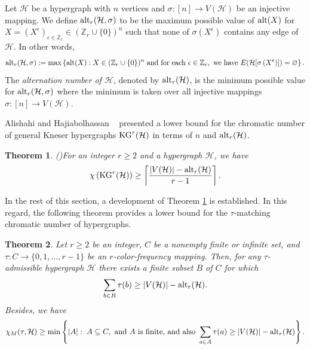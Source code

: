 \documentclass[11pt]{amsart}
\newtheorem{theorem}{Theorem} %
\theoremstyle{definition}
\begin{document}
Let ${\mathcal H}$ be a hypergraph with $n$ vertices and $\sigma:[n]\longrightarrow V({\mathcal H})$ be an injective mapping.
We define ${\rm alt}_r({\mathcal H},\sigma)$ to be the maximum possible value of
${\rm alt} (X)$ for  $X=\displaystyle{\left(X^\epsilon\right)}_{\epsilon\in\mathbb{Z}_r}\in (\mathbb{Z}_r\cup\{0\})^n$ such that none of $\sigma(X^\epsilon)$ contains any edge of ${\mathcal H}$.
In other words,
$${\rm alt}_r({\mathcal H},\sigma) :=\max\left\{{\rm alt}(X): X\in(\mathbb{Z}_r\cup\{0\})^n \mbox{ and for each } \epsilon\in \mathbb{Z}_r, \mbox{ we have } E({\mathcal H}[\sigma\left(X^\epsilon\right)])=\varnothing  \right\}.$$
The {\it alternation number of ${\mathcal H}$}, denoted by ${\rm alt}_r({\mathcal H})$, is the minimum possible value for ${\rm alt}_r({\mathcal H},\sigma)$ where the minimum is taken over all
injective mappings $\sigma:[n]\longrightarrow V({\mathcal H})$.

Alishahi and Hajiabolhassan ~\cite{2013arXiv1302.5394A} presented a lower bound for the chromatic number of general Kneser hypergraphs ${\rm KG}^r({\mathcal H})$ in terms of $n$ and ${\rm alt}_r({\mathcal H})$.
\begin{theorem}{\rm (\cite{2013arXiv1302.5394A})}\label{alihaji}
	For an integer $r\geq 2$ and a hypergraph ${\mathcal H}$, we have
	$$\chi\left({\rm KG}^r({\mathcal H})\right)\geq \left\lceil{ |V({\mathcal H})|-{\rm alt}_r({\mathcal H})\over r-1}\right\rceil.$$
\end{theorem}

In the rest of this section, a development of Theorem \ref{alihaji} is established. In this regard, the following theorem provides a lower bound for the $\tau$-matching chromatic number of hypergraphs.

\begin{theorem}\label{mainthmSaeed}
	Let $r\geq 2$ be an integer, $C$ be a nonempty finite or infinite set, and
	$\tau: C \longrightarrow \{0,1,\ldots,r-1\}$ be an $r$-color-frequency  mapping.
	Then, for any $\tau$-admissible hypergraph ${\mathcal H}$ there exists a finite subset
	$B$ of $C$ for which
	$$\sum_{b\in B}\tau(b) \geq  |V({\mathcal H})|-{\rm alt}_r({\mathcal H}) .$$
	Besides, we have
	$$\chi_M(\tau,{\mathcal H})\geq \min \left\{|A|:\;   A \subseteq C, \mbox{ and } A \mbox{ is finite,}  \mbox{ and also } \sum_{a\in A}\tau(a) \geq  |V({\mathcal H})|-{\rm alt}_r({\mathcal H})\right\}.$$
\end{theorem}
\end{document}
